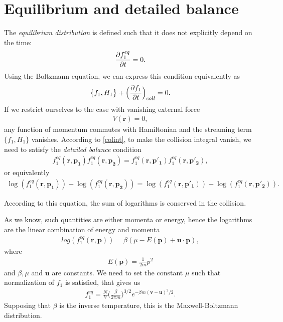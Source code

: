 \section{Equilibrium and detailed balance}
The \textit{equilibrium distribution} is defined such that it does not explicitly depend on the time:
\begin{align*}
\frac{\partial f_1^{eq}}{\partial t} = 0.
\end{align*}
Using the Boltzmann equation, we can express this condition equivalently as
\begin{align*}
\big\{ f_1, H_1 \big\} + \Big( \frac{\partial f_1}{\partial t} \Big)_{coll} = 0.
\end{align*}
If we restrict ourselves to the case with vanishing external force
\begin{align*}
V(\bm{r}) = 0,
\end{align*}
any function of momentum commutes with Hamiltonian and the streaming term $\big\{ f_1, H_1 \big\}$ vanishes.
According to \ref{colint}, to make the collision integral vanish, we need to satisfy the \textit{detailed balance} condition
\begin{align} \label{detailedbalance}
f_1^{eq}(\bm{r},\bm{p_1})f_1^{eq}(\bm{r},\bm{p_2}) = f_1^{eq}(\bm{r},\bm{p'_1})f_1^{eq}(\bm{r},\bm{p'_2}),
\end{align}
or equivalently
\begin{align*}
\log(f_1^{eq}(\bm{r},\bm{p_1})) + \log(f_1^{eq}(\bm{r},\bm{p_2})) = \log(f_1^{eq}(\bm{r},\bm{p'_1})) + \log(f_1^{eq}(\bm{r},\bm{p'_2})).
\end{align*}

According to this equation, the sum of logarithms is conserved in the collision.

As we know, such quantities are either momenta or energy, hence the logarithms are the linear combination of energy and momenta
\begin{align*}
log(f_1^{eq}(\bm{r},\bm{p})) = \beta(\mu - E(\bm{p}) + \bm{u} \cdot \bm{p}),
\end{align*}
where
\begin{align*}
E(\bm{p}) = \frac{1}{2m} p^2
\end{align*}
and $\beta,\mu$ and $\bm{u}$ are constants.
We need to set the constant $\mu$ such that normalization of $f_1$ is satisfied, that gives us
\begin{align} \label{mbt}
f_1^{eq} = \frac{N}{V}\big(\frac{\beta}{2\pi m}\big)^{3/2} e^{-\beta m (\bm{v} - \bm{u})^2/2}.
\end{align}
Supposing that $\beta$ is the inverse temperature, this is the Maxwell-Boltzmann distribution.


